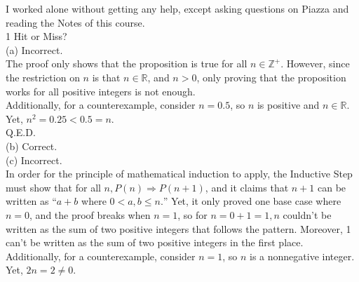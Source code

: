 \documentclass{article}
\begin{document}
I worked alone without getting any help, except asking questions on Piazza and reading the Notes of this course. \\[1cm]
{\Large 1 Hit or Miss?} \\[.5cm]
(a) Incorrect.\\[.3cm]
\indent The proof only shows that the proposition is true for all $n\in\mathbb{Z^+}.$ However, since the restriction on $n$ is that $n\in\mathbb{R}$, and $n > 0$, only proving that the proposition works for all positive integers is not enough.\\[.15cm]
\indent Additionally, for a counterexample, consider $n = 0.5$, so $n$ is positive and $n\in\mathbb{R}$. Yet, $n^2 = 0.25 < 0.5 = n$.\\[.15cm]
\indent Q.E.D.\\[.3cm]
(b) Correct. \\[.3cm]
(c) Incorrect. \\[.3cm]
\indent In order for the principle of mathematical induction to apply, the Inductive Step must show that for all $n, P(n)\Longrightarrow P(n + 1)$, and it claims that $n+1$ can be written as ``$a+b$ where $0 < a,b \leq n.$'' Yet, it only proved one base case where $n = 0$, and the proof breaks when $n = 1$, so for $n = 0 + 1 = 1, n$ couldn't be written as the sum of two positive integers that follows the pattern. Moreover, 1 can't  be written as the sum of two positive integers in the first place.\\[.15cm]
\indent Additionally, for a counterexample, consider $n = 1$, so $n$ is a nonnegative integer. Yet, $2n = 2 \neq 0$.\\[.15cm]
\end{document}

